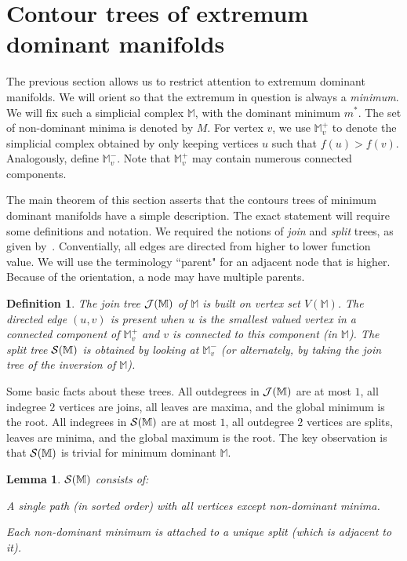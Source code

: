 \documentclass[11pt]{article}
\newtheorem{lemma}[theorem]{Lemma}
\newtheorem{definition}[theorem]{Definition}
\theoremstyle{definition}
\newcommand{\cJ}{{\cal J}}
\newcommand{\cS}{{\cal S}}
\newcommand{\MM}{\mathbb{M}}
\begin{document}
\section{Contour trees of extremum dominant manifolds} \label{sec:paint}

The previous section allows us to restrict attention to extremum dominant manifolds.
We will orient so that the extremum in question is always a \emph{minimum}.
We will fix such a simplicial complex $\MM$, with the dominant minimum $m^*$. 
The set of non-dominant minima is denoted by $M$.
For vertex $v$, we use $\MM^+_v$ to denote the simplicial complex obtained by only
keeping vertices $u$ such that $f(u) > f(v)$. Analogously, define $\MM^-_v$. Note that $\MM^+_v$ may contain
numerous connected components. 

The main theorem of this section asserts that the contours trees of minimum dominant manifolds have a simple description.
The exact statement will require some definitions and notation.
We required the notions of \emph{join} and \emph{split} trees, as given by~\cite{csa-cctad-00}.
Conventially, all edges are directed from higher to lower function value. We will use the terminology
``parent" for an adjacent node that is higher. Because of the orientation, a node
may have multiple parents.

\begin{definition} \label{join} The join tree $\cJ(\MM)$ of $\MM$ is built on vertex set $V(\MM)$.
The directed edge $(u,v)$ is present when $u$ is the smallest valued vertex in a connected component of $\MM^+_v$
\emph{and} $v$ is connected to this component (in $\MM$). The split tree $\cS(\MM)$ is obtained
by looking at $\MM^-_v$ (or alternately, by taking the join tree of the inversion of $\MM$). 
\end{definition}


Some basic facts about these trees. 
All outdegrees in $\cJ(\MM)$ are at most $1$, all indegree $2$ vertices are joins, all leaves are maxima,
and the global minimum is the root. All indegrees in $\cS(\MM)$ are at most $1$, all outdegree $2$
vertices are splits, leaves are minima, and the global maximum is the root.
The key observation is that $\cS(\MM)$ is trivial for minimum dominant $\MM$.

\begin{lemma} \label{lem:split} $\cS(\MM)$ consists of:
\begin{asparaitem}
	\item A single path (in sorted order) with all vertices except non-dominant minima.
	\item Each non-dominant minimum is attached to a unique split (which is adjacent to it).
\end{asparaitem}
\end{lemma}
\end{document}
